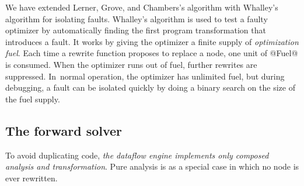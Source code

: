 \documentclass[blockstyle,preprint,nocopyrightspace]{sigplanconf}
\newcommand{\authornote}[1]{{\em #1}}
\def\authornote#1{\unskip\relax}
\newcommand{\simon}[1]{\authornote{SLPJ: #1}}
\newcommand{\norman}[1]{\authornote{NR: #1}}
\let\remark\norman
\newcommand\seclabel[1]{\label{sec:#1}}
\begin{document}
\seclabel{vpoiso}

We have extended Lerner, Grove, and Chambers's algorithm with
Whalley's \citeyearpar{whalley:isolation} algorithm for isolating
faults.
Whalley's algorithm is used to test a faulty optimizer by automatically
finding the first program transformation that introduces a fault.
It works by giving the optimizer a finite supply of \emph{optimization
fuel}.
Each time a rewrite function proposes to replace a node, one unit of @Fuel@ is
consumed.
When the optimizer runs out of fuel, further rewrites are suppressed.
In~normal operation, the optimizer has unlimited fuel, but during
debugging, a fault can be isolated quickly by doing a binary search on
the size of the fuel supply.


\subsection{The forward solver}

\simon{By this time I'm getting tired.  This section has a lot of nitty
gritty detail but, becuase it is explaining a complex implementation,
it is necessarily incomplete. So the question in my mind is this: what
does the reader learn from the rest of Section 7?  What new insights
are gained, beyond a quick sketch of a particular implementation?
For example, is it notably simpler than the OCaml version or Chambers's version?
If so, what led to this simplicity?

Give the time, one possibility would be to trim Section 7 down a lot,
which would give more space (and time!) for clarifying remarks earlier.
(We are already up to page 14.)

There are quite a few Simon comments in what follows, but I gave it
much less time per line than earlier stuff.}

\remark{It's dramatically simpler than Chambers's stuff because it's
  purely functional and it's polymorphic.  For the OCaml stuff I'd
  have to compare more carefully.
I'd like John to weigh in here---I~understood him to say that if we
  don't deliver the implementation of the dataflow engine, we're
  omitting a critical part of our design.}
\simon{PS: currently the polymorphism is mentioned iter alia, but
is never the focus; yet it's one of our major claims, so it deserves
explicit treatment.  Not necessarily here.}

To avoid duplicating code,
\emph{the dataflow engine implements only composed
analysis and transformation}.
Pure analysis is as a special case in which no node is
ever rewritten.
\end{document}
